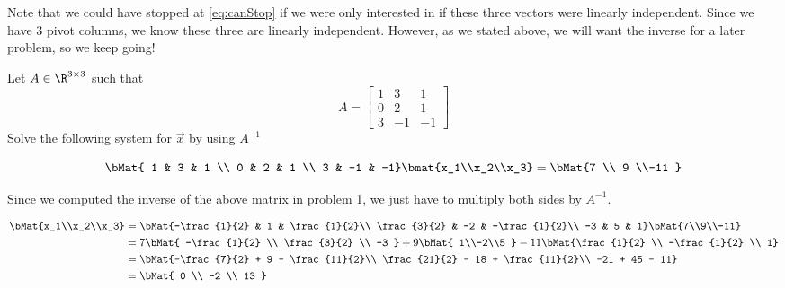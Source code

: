 \documentclass[answers]{exam}
\begin{document}
\begin{questions}
\begin{solution}
        Note that we could have stopped at \ref{eq:canStop} if we were only interested in if
        these three vectors were linearly independent. Since we have 3 pivot columns, we know these
        three are linearly independent. However, as we stated above, we will want the inverse
        for a later problem, so we keep going!
    \end{solution}
    \newpage
    \question[10]Let $A\in\R^{3\times 3}$ such that
    \[
        A = \begin{bmatrix}
            1 & 3 & 1 \\
            0 & 2 & 1 \\
            3 & -1 & -1
        \end{bmatrix}
    \]
    Solve the following system for $\vec{x}$ by using $A^{-1}$

    \[
        \bMat{
            1 & 3 & 1 \\
            0 & 2 & 1 \\
            3 & -1 & -1}\bmat{x_1\\x_2\\x_3} = \bMat{7 \\ 9 \\-11 }
    \]
    \begin{solution}
        Since we computed the inverse of the above matrix in problem 1, we just have to multiply
        both sides by $A^{-1}$.

        \begin{align*}
            \bMat{x_1\\x_2\\x_3}    &= \bMat{-\frac{1}{2} & 1 & \frac{1}{2}\\
                                         \frac{3}{2} & -2 & -\frac{1}{2}\\
                                         -3 & 5 & 1}\bMat{7\\9\\-11}\\
                &= 7\bMat{ -\frac{1}{2} \\ \frac{3}{2} \\ -3 }
                + 9\bMat{ 1\\-2\\5 } - 11\bMat{\frac{1}{2} \\ -\frac{1}{2} \\ 1} \\
                &= \bMat{-\frac{7}{2} + 9 - \frac{11}{2}\\
                         \frac{21}{2} - 18 + \frac{11}{2}\\
                         -21 + 45 - 11} \\
                &= \bMat{
                    0 \\
                    -2 \\
                    13
                }
        \end{align*}
    \end{solution}
\end{questions}
\end{document}
